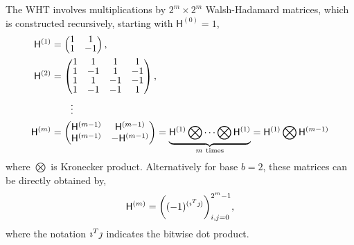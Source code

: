 \documentclass{svjour3}                     %
\let\vec\relax
\newcommand{\mH}{\mathsf{H}}
\begin{document}
The WHT involves multiplications by $2^m \times 2^m$ Walsh-Hadamard matrices, which is constructed recursively, starting with $\mH^{(0)} = 1$,
\begin{align}
\nonumber
\arraycolsep=1.4pt\def\arraystretch{0.9}
\mH^{(1)} &=
\begin{pmatrix}
1 & 1 \\ 1 & -1
\end{pmatrix}, \\
\nonumber
\mH^{(2)} &= 
\begin{pmatrix}
1 & 1 & 1 & 1 \\ 
1 & -1 & 1 & -1 \\
1 & 1 & -1 & -1 \\ 
1 & -1 & -1 & 1 \\
\end{pmatrix}, \\
\nonumber
& \qquad \vdots
\\
\label{eqn:hadamard_matrix}
\mH^{(m)} &= 
\begin{pmatrix}
\mH^{(m-1)} & \mH^{(m-1)} \\ \mH^{(m-1)} & -\mH^{(m-1)}
\end{pmatrix} 
= \underbrace{\mH^{(1)} \bigotimes \cdots \bigotimes \mH^{(1)}}_{m \ \text{times}} 
= \mH^{(1)} \bigotimes \mH^{(m-1)}
\end{align}
where $\bigotimes$ is Kronecker product. Alternatively for base $b=2$, these matrices can be  directly obtained by,
\begin{align*}
\mH^{(m)} %
= \bigg((-1)^{(\vec{\imath}^T \vec{\jmath})} \bigg)_{i,j=0}^{2^m-1},
\end{align*}
where the notation $\vec{\imath}^T \vec{\jmath}$ indicates the bitwise dot product. 

\end{document}
